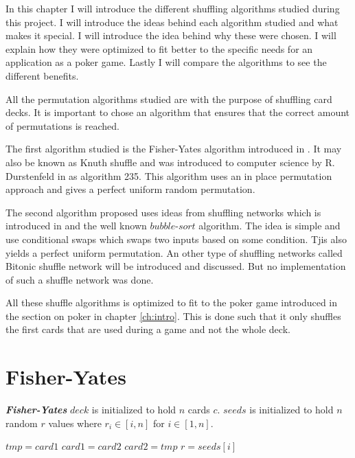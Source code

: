 In this chapter I will introduce the different shuffling algorithms studied during this project. I will introduce the ideas behind each algorithm studied and what makes it special. I will introduce the idea behind why these were chosen. I will explain how they were optimized to fit better to the specific needs for an application as a poker game. Lastly I will compare the algorithms to see the different benefits. 

All the permutation algorithms studied are with the purpose of shuffling card decks. It is important to chose an algorithm that ensures that the correct amount of permutations is reached.

The first algorithm studied is the Fisher-Yates algorithm introduced in . It may also be known as Knuth shuffle and was introduced to computer science by R. Durstenfeld in  as algorithm 235. This algorithm uses an in place permutation approach and gives a perfect uniform random permutation.

The second algorithm proposed uses ideas from shuffling networks which is introduced in  and the well known $bubble\text{-}sort$ algorithm. The idea is simple and use conditional swaps which swaps two inputs based on some condition. Tjis also yields a perfect uniform permutation.
An other type of shuffling networks called Bitonic shuffle network will be introduced and discussed. But no implementation of such a shuffle network was done.

All these shuffle algorithms is optimized to fit to the poker game introduced in the section on poker in chapter \ref{ch:intro}. This is done such that it only shuffles the first cards that are used during a game and not the whole deck.

\section{Fisher-Yates}
\begin{algorithm}
\caption{\textbf{\textit{Fisher-Yates}} \newline
    $deck$ is initialized to hold $n$ cards $c$. \newline
    $seeds$ is initialized to hold $n$ random $r$ values where $r_i\in[i,n]$ for $i\in [1,n]$.
}
\label{fisher_yates_alg}

\begin{algorithmic}[1]
\State $tmp = card1$
\State $card1 = card2$
\State $card2 = tmp$
\EndFunction
\State
{}
\State $r = seeds[i]$
\State {}
\EndFor
\EndFunction
\end{algorithmic}
\end{algorithm}

